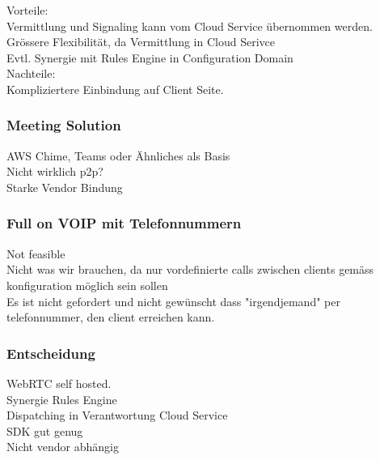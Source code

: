Vorteile: \\

Vermittlung und Signaling kann vom Cloud Service übernommen werden. \\
Grössere Flexibilität, da Vermittlung in Cloud Serivce \\
Evtl. Synergie mit Rules Engine in Configuration Domain \\

Nachteile: \\

Kompliziertere Einbindung auf Client Seite.


\subsubsection{Meeting Solution}

AWS Chime, Teams oder Ähnliches als Basis \\
Nicht wirklich p2p? \\
Starke Vendor Bindung \\



\subsubsection*{Full on VOIP mit Telefonnummern}

Not feasible \\
Nicht was wir brauchen, da nur vordefinierte calls zwischen clients gemäss konfiguration möglich sein sollen \\
Es ist nicht gefordert und nicht gewünscht dass "irgendjemand" per telefonnummer, den client erreichen kann. \\


\subsubsection{Entscheidung}

WebRTC self hosted. \\

Synergie Rules Engine \\
Dispatching in Verantwortung Cloud Service \\
SDK gut genug \\
Nicht vendor abhängig \\


\clearpage
